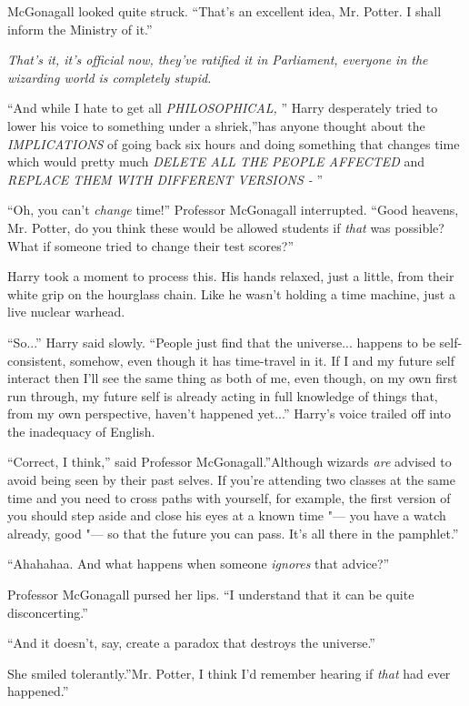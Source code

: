 McGonagall looked quite struck. ``That's an excellent idea, Mr. Potter.
I shall inform the Ministry of it.''

\emph{That's it, it's official now, they've ratified it in Parliament,
everyone in the wizarding world is completely stupid.}

``And while I hate to get all \emph{PHILOSOPHICAL,} '' Harry desperately
tried to lower his voice to something under a shriek,''has anyone
thought about the \emph{IMPLICATIONS} of going back six hours and doing
something that changes time which would pretty much \emph{DELETE ALL THE
PEOPLE AFFECTED} and \emph{REPLACE THEM WITH DIFFERENT VERSIONS -} ''

``Oh, you can't \emph{change} time!'' Professor McGonagall interrupted.
``Good heavens, Mr. Potter, do you think these would be allowed students
if \emph{that} was possible? What if someone tried to change their test
scores?''

Harry took a moment to process this. His hands relaxed, just a little,
from their white grip on the hourglass chain. Like he wasn't holding a
time machine, just a live nuclear warhead.

``So...'' Harry said slowly. ``People just find that the
universe... happens to be self-consistent, somehow, even though it
has time-travel in it. If I and my future self interact then I'll see
the same thing as both of me, even though, on my own first run through,
my future self is already acting in full knowledge of things that, from
my own perspective, haven't happened yet...'' Harry's voice trailed
off into the inadequacy of English.

``Correct, I think,'' said Professor McGonagall.''Although wizards
\emph{are} advised to avoid being seen by their past selves. If you're
attending two classes at the same time and you need to cross paths with
yourself, for example, the first version of you should step aside and
close his eyes at a known time "--- you have a watch already, good "--- so
that the future you can pass. It's all there in the pamphlet.''

``Ahahahaa. And what happens when someone \emph{ignores} that advice?''

Professor McGonagall pursed her lips. ``I understand that it can be
quite disconcerting.''

``And it doesn't, say, create a paradox that destroys the universe.''

She smiled tolerantly.''Mr. Potter, I think I'd remember hearing if
\emph{that} had ever happened.''

